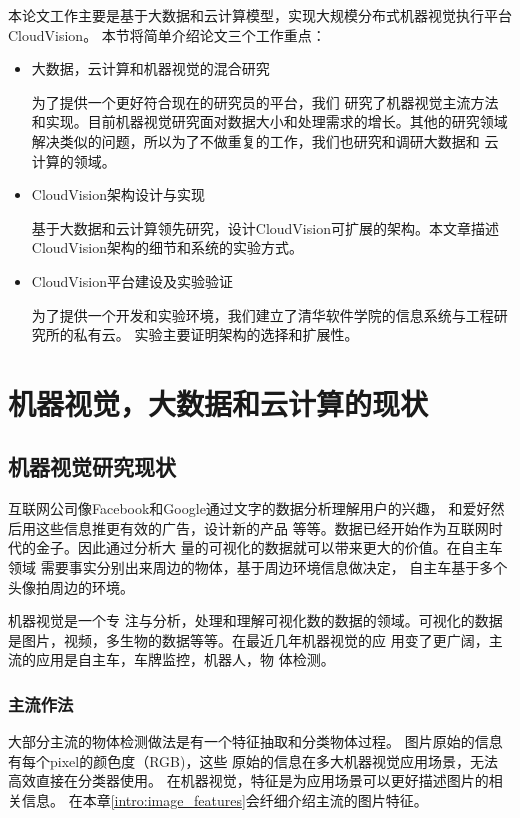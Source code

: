 本论文工作主要是基于大数据和云计算模型，实现大规模分布式机器视觉执行平台CloudVision。
本节将简单介绍论文三个工作重点：
\begin{itemize}
  \item 大数据，云计算和机器视觉的混合研究

        为了提供一个更好符合现在的研究员的平台，我们
        研究了机器视觉主流方法和实现。目前机器视觉研究面对数据大小和处理需求的增长。其他的研究领域
        解决类似的问题，所以为了不做重复的工作，我们也研究和调研大数据和
        云计算的领域。

  \item CloudVision架构设计与实现

        基于大数据和云计算领先研究，设计CloudVision可扩展的架构。本文章描述
        CloudVision架构的细节和系统的实验方式。

  \item CloudVision平台建设及实验验证

        为了提供一个开发和实验环境，我们建立了清华软件学院的信息系统与工程研究所的私有云。
        实验主要证明架构的选择和扩展性。

\end{itemize}



\chapter{机器视觉，大数据和云计算的现状}
\label{sec:current_state}

\section{机器视觉研究现状}
\label{subsec:cv_background}
互联网公司像Facebook和Google通过文字的数据分析理解用户的兴趣，
和爱好然后用这些信息推更有效的广告，设计新的产品
等等。数据已经开始作为互联网时代的金子。因此通过分析大
量的可视化的数据就可以带来更大的价值。在自主车领域
需要事实分别出来周边的物体，基于周边环境信息做决定，
自主车基于多个头像拍周边的环境。

机器视觉是一个专
注与分析，处理和理解可视化数的数据的领域。可视化的数据
是图片，视频，多生物的数据等等。在最近几年机器视觉的应
用变了更广阔，主流的应用是自主车，车牌监控，机器人，物
体检测。


\subsection{主流作法}
大部分主流的物体检测做法是有一个特征抽取和分类物体过程。\cite{juan2009comparison}
图片原始的信息有每个pixel的颜色度（RGB)，这些
原始的信息在多大机器视觉应用场景，无法高效直接在分类器使用。
在机器视觉，特征是为应用场景可以更好描述图片的相关信息。
在本章\ref{intro:image_features}会纤细介绍主流的图片特征。

